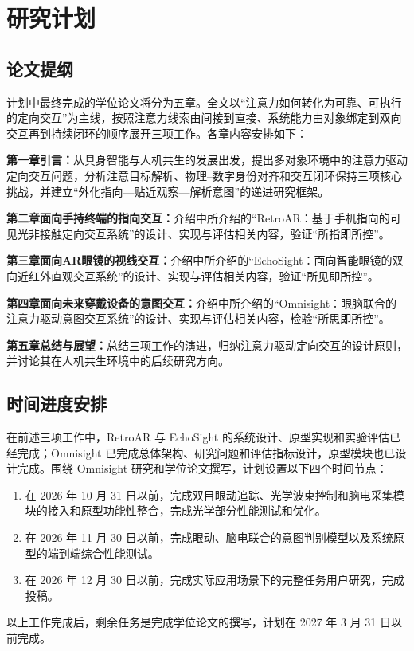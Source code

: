 \chapter{研究计划}
\section{论文提纲}
计划中最终完成的学位论文将分为五章。全文以“注意力如何转化为可靠、可执行的定向交互”为主线，按照注意力线索由间接到直接、系统能力由对象绑定到双向交互再到持续闭环的顺序展开三项工作。各章内容安排如下：

\textbf{第一章引言：}从具身智能与人机共生的发展出发，提出多对象环境中的注意力驱动定向交互问题，分析注意目标解析、物理--数字身份对齐和交互闭环保持三项核心挑战，并建立“外化指向—贴近观察—解析意图”的递进研究框架。

\textbf{第二章面向手持终端的指向交互：}介绍中所介绍的“RetroAR：基于手机指向的可见光非接触定向交互系统”的设计、实现与评估相关内容，验证“所指即所控”。

\textbf{第三章面向AR眼镜的视线交互：}介绍中所介绍的“EchoSight：面向智能眼镜的双向近红外直观交互系统”的设计、实现与评估相关内容，验证“所见即所控”。

\textbf{第四章面向未来穿戴设备的意图交互：}介绍中所介绍的“Omnisight：眼脑联合的注意力驱动意图交互系统”的设计、实现与评估相关内容，检验“所思即所控”。

\textbf{第五章总结与展望：}总结三项工作的演进，归纳注意力驱动定向交互的设计原则，并讨论其在人机共生环境中的后续研究方向。

\section{时间进度安排}
在前述三项工作中，RetroAR 与 EchoSight 的系统设计、原型实现和实验评估已经完成；Omnisight 已完成总体架构、研究问题和评估指标设计，原型模块也已设计完成。围绕 Omnisight 研究和学位论文撰写，计划设置以下四个时间节点：
\begin{enumerate}
  \item 在 2026 年 10 月 31 日以前，完成双目眼动追踪、光学波束控制和脑电采集模块的接入和原型功能性整合，完成光学部分性能测试和优化。
  \item 在 2026 年 11 月 30 日以前，完成眼动、脑电联合的意图判别模型以及系统原型的端到端综合性能测试。
  \item 在 2026 年 12 月 30 日以前，完成实际应用场景下的完整任务用户研究，完成投稿。
\end{enumerate}

以上工作完成后，剩余任务是完成学位论文的撰写，计划在 2027 年 3 月 31 日以前完成。
